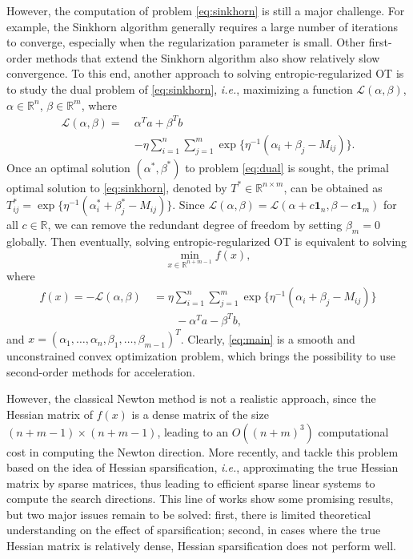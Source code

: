 \documentclass{article}
\theoremstyle{plain}
\theoremstyle{definition}
\theoremstyle{remark}
\begin{document}
However, the computation of problem \eqref{eq:sinkhorn} is still a major challenge.
For example, the Sinkhorn algorithm generally requires a large number of iterations to converge, especially when the regularization parameter is small.
Other first-order methods that extend the Sinkhorn algorithm also show relatively slow convergence.
To this end, another approach to solving entropic-regularized OT is to study the dual problem of \eqref{eq:sinkhorn}, \emph{i.e.}, maximizing a function $\mathcal{L}(\alpha,\beta)$, $\alpha\in\mathbb{R}^n$, $\beta\in\mathbb{R}^m$, where
\begin{align}
\mathcal{L}(\alpha,\beta)=\ & \alpha^{T}a+\beta^{T}b \nonumber\\
 & -\eta\sum_{i=1}^{n}\sum_{j=1}^{m}\exp\{\eta^{-1}(\alpha_{i}+\beta_{j}-M_{ij})\}. \label{eq:dual}
\end{align}
Once an optimal solution $(\alpha^*,\beta^*)$ to problem \eqref{eq:dual} is sought, the primal optimal solution to \eqref{eq:sinkhorn}, denoted by $T^*\in\mathbb{R}^{n\times m}$, can be obtained as $T_{ij}^*=\exp\{ \eta^{-1}(\alpha_i^* + \beta_j^* - M_{ij}) \}$.
Since $\mathcal{L}(\alpha, \beta) = \mathcal{L}(\alpha + c \mathbf{1}_n, \beta - c \mathbf{1}_m)$ for all $c \in \mathbb{R}$, we can remove the redundant degree of freedom by setting $\beta_m = 0$ globally.
Then eventually, solving entropic-regularized OT is equivalent to solving
\begin{equation}
\label{eq:main}
\min_{x\in\mathbb{R}^{n+m-1}} f(x),
\end{equation}
where
\begin{align*}
f(x)=-\mathcal{L}(\alpha, \beta)\ & = \eta\sum_{i=1}^{n}\sum_{j=1}^{m}\exp\{\eta^{-1}(\alpha_{i}+\beta_{j}-M_{ij})\}\nonumber\\
 & \qquad-\alpha^T a-\beta^T b, \label{eq:objective}
\end{align*}
and $x = (\alpha_1,\ldots,\alpha_n,\beta_1,\ldots,\beta_{m-1})^T$.
Clearly, \eqref{eq:main} is a smooth and unconstrained convex optimization problem, which brings the possibility to use second-order methods for acceleration.

However, the classical Newton method is not a realistic approach, since the Hessian matrix of $f(x)$ is a dense matrix of the size $(n+m-1)\times(n+m-1)$, leading to an $O((n+m)^3)$ computational cost in computing the Newton direction. More recently,
\citet{tang2024accelerating} and \citet{tang2024safe} tackle this problem based on the idea of Hessian sparsification, \emph{i.e.}, approximating the true Hessian matrix by sparse matrices, thus leading to efficient sparse linear systems to compute the search directions. This line of works show some promising results, but two major issues remain to be solved: first, there is limited theoretical understanding on the effect of sparsification; second, in cases where the true Hessian matrix is relatively dense, Hessian sparsification does not perform well.
\end{document}
